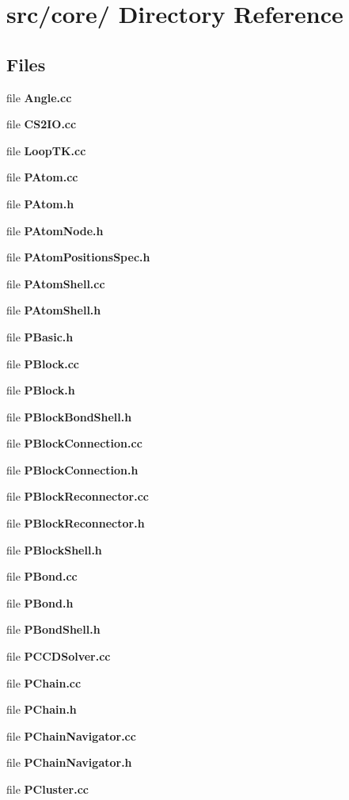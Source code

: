 \section{src/core/ Directory Reference}
\label{dir_4df2d742f9257598b4c1a9c1a0a3225b}


\subsection*{Files}
\begin{CompactItemize}
\item 
file {\bf Angle.cc}
\item 
file {\bf CS2IO.cc}
\item 
file {\bf Loop\-TK.cc}
\item 
file {\bf PAtom.cc}
\item 
file {\bf PAtom.h}
\item 
file {\bf PAtom\-Node.h}
\item 
file {\bf PAtom\-Positions\-Spec.h}
\item 
file {\bf PAtom\-Shell.cc}
\item 
file {\bf PAtom\-Shell.h}
\item 
file {\bf PBasic.h}
\item 
file {\bf PBlock.cc}
\item 
file {\bf PBlock.h}
\item 
file {\bf PBlock\-Bond\-Shell.h}
\item 
file {\bf PBlock\-Connection.cc}
\item 
file {\bf PBlock\-Connection.h}
\item 
file {\bf PBlock\-Reconnector.cc}
\item 
file {\bf PBlock\-Reconnector.h}
\item 
file {\bf PBlock\-Shell.h}
\item 
file {\bf PBond.cc}
\item 
file {\bf PBond.h}
\item 
file {\bf PBond\-Shell.h}
\item 
file {\bf PCCDSolver.cc}
\item 
file {\bf PChain.cc}
\item 
file {\bf PChain.h}
\item 
file {\bf PChain\-Navigator.cc}
\item 
file {\bf PChain\-Navigator.h}
\item 
file {\bf PCluster.cc}
\item 

\end{CompactItemize}

